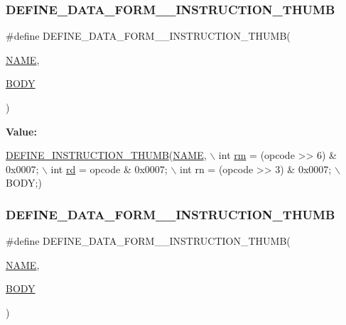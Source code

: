 \subsubsection{\texorpdfstring{D\+E\+F\+I\+N\+E\+\_\+\+D\+A\+T\+A\+\_\+\+F\+O\+R\+M\+\_\+\_\+\+I\+N\+S\+T\+R\+U\+C\+T\+I\+O\+N\+\_\+\+T\+H\+U\+MB}{DEFINE\_DATA\_FORM\_1\_INSTRUCTION\_THUMB}}
{\footnotesize\ttfamily \#define D\+E\+F\+I\+N\+E\+\_\+\+D\+A\+T\+A\+\_\+\+F\+O\+R\+M\+\_\+\_\+\+I\+N\+S\+T\+R\+U\+C\+T\+I\+O\+N\+\_\+\+T\+H\+U\+MB(\begin{DoxyParamCaption}\item[{}]{\mbox{\hyperlink{inflate_8h_a164ea0159d5f0b5f12a646f25f99eceaa67bc2ced260a8e43805d2480a785d312}{N\+A\+ME}},  }\item[{}]{\mbox{\hyperlink{gzlog_8c_aa6bdf6a6d9916c343e1e17774d84a156}{B\+O\+DY}} }\end{DoxyParamCaption})}

{\bfseries Value\+:}
\begin{DoxyCode}
\mbox{\hyperlink{isa-thumb_8c_aca0a4c9b536fe9f14f89105945cfeb3d}{DEFINE\_INSTRUCTION\_THUMB}}(\mbox{\hyperlink{inflate_8h_a164ea0159d5f0b5f12a646f25f99eceaa67bc2ced260a8e43805d2480a785d312}{NAME}}, \(\backslash\)
        \textcolor{keywordtype}{int} \mbox{\hyperlink{isa-thumb_8c_a20e40d2fb8c51fa4dd2b4449ad32e111}{rm}} = (opcode >> 6) & 0x0007; \(\backslash\)
        int \mbox{\hyperlink{isa-arm_8c_a555541ce18ed9b5fad657a06b22cb465}{rd}} = opcode & 0x0007; \(\backslash\)
        int rn = (opcode >> 3) & 0x0007; \(\backslash\)
        BODY;)
\end{DoxyCode}
\mbox{\label{isa-thumb_8c_a15f12dff40c028a3f6debe9363926466}} 
\subsubsection{\texorpdfstring{D\+E\+F\+I\+N\+E\+\_\+\+D\+A\+T\+A\+\_\+\+F\+O\+R\+M\+\_\+\_\+\+I\+N\+S\+T\+R\+U\+C\+T\+I\+O\+N\+\_\+\+T\+H\+U\+MB}{DEFINE\_DATA\_FORM\_2\_INSTRUCTION\_THUMB}}
{\footnotesize\ttfamily \#define D\+E\+F\+I\+N\+E\+\_\+\+D\+A\+T\+A\+\_\+\+F\+O\+R\+M\+\_\+\_\+\+I\+N\+S\+T\+R\+U\+C\+T\+I\+O\+N\+\_\+\+T\+H\+U\+MB(\begin{DoxyParamCaption}\item[{}]{\mbox{\hyperlink{inflate_8h_a164ea0159d5f0b5f12a646f25f99eceaa67bc2ced260a8e43805d2480a785d312}{N\+A\+ME}},  }\item[{}]{\mbox{\hyperlink{gzlog_8c_aa6bdf6a6d9916c343e1e17774d84a156}{B\+O\+DY}} }\end{DoxyParamCaption})}

